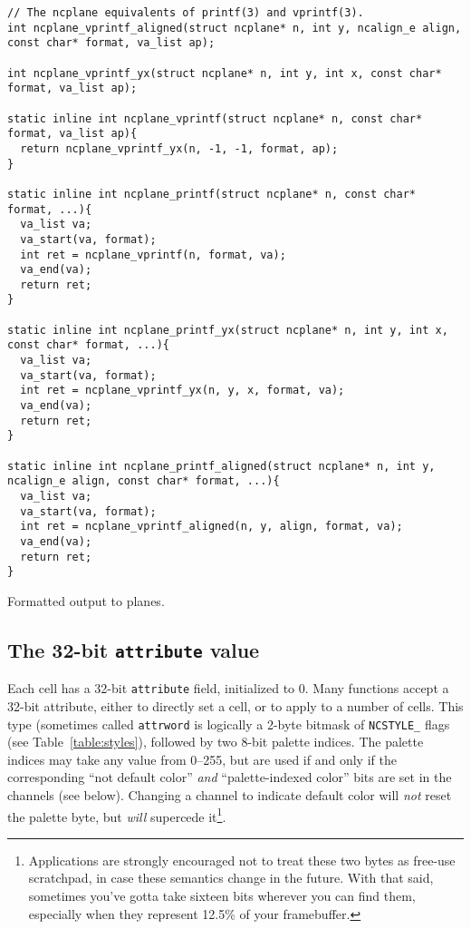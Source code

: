 \begin{listing}[!htb]
\begin{verbatim}
// The ncplane equivalents of printf(3) and vprintf(3).
int ncplane_vprintf_aligned(struct ncplane* n, int y, ncalign_e align, const char* format, va_list ap);

int ncplane_vprintf_yx(struct ncplane* n, int y, int x, const char* format, va_list ap);

static inline int ncplane_vprintf(struct ncplane* n, const char* format, va_list ap){
  return ncplane_vprintf_yx(n, -1, -1, format, ap);
}

static inline int ncplane_printf(struct ncplane* n, const char* format, ...){
  va_list va;
  va_start(va, format);
  int ret = ncplane_vprintf(n, format, va);
  va_end(va);
  return ret;
}

static inline int ncplane_printf_yx(struct ncplane* n, int y, int x, const char* format, ...){
  va_list va;
  va_start(va, format);
  int ret = ncplane_vprintf_yx(n, y, x, format, va);
  va_end(va);
  return ret;
}

static inline int ncplane_printf_aligned(struct ncplane* n, int y, ncalign_e align, const char* format, ...){
  va_list va;
  va_start(va, format);
  int ret = ncplane_vprintf_aligned(n, y, align, format, va);
  va_end(va);
  return ret;
}
\end{verbatim}
\caption{Formatted output to planes.}
\label{list:printf}
\end{listing}

\subsection{The 32-bit \texttt{attribute} value}
\label{sec:attribute}
Each cell has a 32-bit \texttt{attribute} field, initialized to 0. Many functions
accept a 32-bit attribute, either to directly set a cell, or to apply to a number
of cells. This type (sometimes called \texttt{attrword} is logically a 2-byte
bitmask of \texttt{NCSTYLE\_} flags (see Table~\ref{table:styles}), followed by two 8-bit palette indices. The
palette indices may take any value from 0--255, but are used if and only if the
corresponding ``not default color'' \textit{and} ``palette-indexed color'' bits
are set in the channels (see below). Changing a channel to indicate default color
will \textit{not} reset the palette byte, but \textit{will} supercede
it\footnote{Applications are strongly encouraged not to treat these two bytes as free-use scratchpad, in
case these semantics change in the future. With that said, sometimes you've gotta
take sixteen bits wherever you can find them, especially when they represent 12.5\%
of your framebuffer.}.

